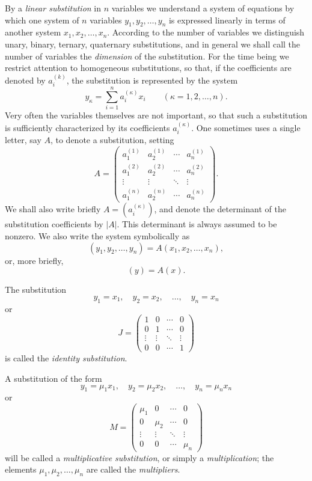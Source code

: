 \documentclass[11pt,a4paper]{book}
\begin{document}
By a \emph{linear substitution} in \(n\) variables we understand a system of equations by which one system of \(n\) variables \(y_1,y_2,\dots,y_n\) is expressed linearly in terms of another system \(x_1,x_2,\dots,x_n\). According to the number of variables we distinguish unary, binary, ternary, quaternary substitutions, and in general we shall call the number of variables the \emph{dimension} of the substitution. For the time being we restrict attention to homogeneous substitutions, so that, if the coefficients are denoted by \(a^{(k)}_i\), the substitution is represented by the system
\[
y_\kappa=\sum_{i=1}^n a^{(\kappa)}_i x_i
\qquad (\kappa=1,2,\dots,n).
\tag{1}
\]
Very often the variables themselves are not important, so that such a substitution is sufficiently characterized by its coefficients \(a^{(\kappa)}_i\). One sometimes uses a single letter, say \(A\), to denote a substitution, setting
\[
A=
\begin{pmatrix}
a^{(1)}_1 & a^{(1)}_2 & \cdots & a^{(1)}_n \\
a^{(2)}_1 & a^{(2)}_2 & \cdots & a^{(2)}_n \\
\vdots & \vdots & \ddots & \vdots \\
a^{(n)}_1 & a^{(n)}_2 & \cdots & a^{(n)}_n
\end{pmatrix}.
\tag{2}
\]
We shall also write briefly \(A=(a^{(\kappa)}_i)\), and denote the determinant of the substitution coefficients by \(|A|\). This determinant is always assumed to be nonzero. We also write the system symbolically as
\[
(y_1,y_2,\dots,y_n)=A(x_1,x_2,\dots,x_n),
\tag{3}
\]
or, more briefly,
\[
(y)=A(x).
\tag{4}
\]

The substitution
\[
y_1=x_1,\quad y_2=x_2,\quad \dots,\quad y_n=x_n
\tag{5}
\]
or
\[
J=
\begin{pmatrix}
1 & 0 & \cdots & 0\\
0 & 1 & \cdots & 0\\
\vdots & \vdots & \ddots & \vdots\\
0 & 0 & \cdots & 1
\end{pmatrix}
\tag{6}
\]
is called the \emph{identity substitution}.

A substitution of the form
\[
y_1=\mu_1x_1,\quad y_2=\mu_2x_2,\quad \dots,\quad y_n=\mu_nx_n
\tag{7}
\]
or
\[
M=
\begin{pmatrix}
\mu_1 & 0 & \cdots & 0\\
0 & \mu_2 & \cdots & 0\\
\vdots & \vdots & \ddots & \vdots\\
0 & 0 & \cdots & \mu_n
\end{pmatrix}
\tag{8}
\]
will be called a \emph{multiplicative substitution}, or simply a \emph{multiplication}; the elements \(\mu_1,\mu_2,\dots,\mu_n\) are called the \emph{multipliers}.
\end{document}
